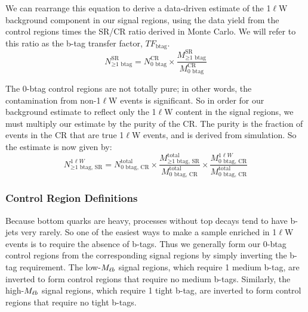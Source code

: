 We can rearrange this equation to derive
a data-driven estimate of the 1$\ell$W background component in our
signal regions, using the data yield from the control regions times
the SR/CR ratio derived in Monte Carlo. We will refer to this ratio as
the b-tag transfer factor, $TF_\text{btag}$.
\begin{equation}
\label{eq:stop:1lw:estimateimpure}
N_{\geq\text{1 btag}}^\text{SR} = N_\text{0 btag}^\text{CR} \times
\frac{M_{\geq\text{1 btag}}^\text{SR}}{M_\text{0 btag}^\text{CR}}
\end{equation}

The 0-btag control regions are not totally pure; in other words, the
contamination from non-1$\ell$W events is significant. So in order for
our background estimate to reflect only the 1$\ell$W content in the
signal regions, we must multiply our estimate by the purity of the
CR. The purity is the fraction of events in the CR that are true
1$\ell$W events, and is derived from simulation. So the estimate is
now given by:
\begin{equation}
\label{eq:stop:1lw:estimatepure}
N_{\geq\text{1 btag, SR}}^{1\ell W} = N_\text{0 btag, CR}^\text{total} \times
\frac{M_{\geq\text{1 btag, SR}}^\text{total}}{M_\text{0 btag, CR}^\text{total}} \times
\frac{M_\text{0 btag, CR}^{1\ell W}}{M_\text{0 btag, CR}^\text{total}}
\end{equation}

\subsubsection{Control Region Definitions}
\label{sssec:stop:1lw:crdefinitions}

Because bottom quarks are heavy, processes without top decays tend to
have b-jets very rarely. So one of the easiest ways to make a sample
enriched in 1$\ell$W events is to require the absence of b-tags.
Thus we generally form our 0-btag control regions from the
corresponding signal regions by simply inverting
the b-tag requirement. The low-$M_{\ell b}$ signal regions, which
require 1 medium b-tag, are inverted to form control regions that require no medium
b-tags. Similarly, the high-$M_{\ell b}$ signal regions, which require
1 tight b-tag, are inverted to form control regions that require no
tight b-tags.

